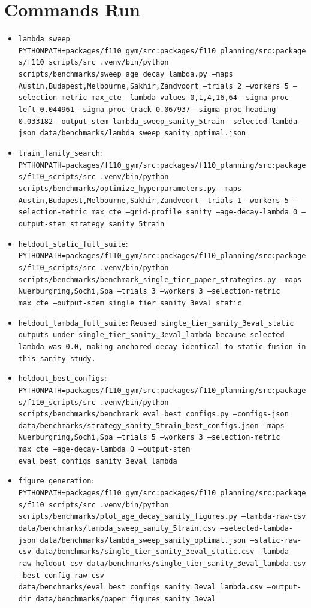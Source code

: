 \documentclass[conference]{IEEEtran}
\begin{document}
\section{Commands Run}
\begin{itemize}[leftmargin=*]
\item \texttt{lambda\_sweep}: \texttt{PYTHONPATH=packages/f110\_gym/src:packages/f110\_planning/src:packages/f110\_scripts/src .venv/bin/python scripts/benchmarks/sweep\_age\_decay\_lambda.py --maps Austin,Budapest,Melbourne,Sakhir,Zandvoort --trials 2 --workers 5 --selection-metric max\_cte --lambda-values 0,1,4,16,64 --sigma-proc-left 0.044961 --sigma-proc-track 0.067937 --sigma-proc-heading 0.033182 --output-stem lambda\_sweep\_sanity\_5train --selected-lambda-json data/benchmarks/lambda\_sweep\_sanity\_optimal.json}
\item \texttt{train\_family\_search}: \texttt{PYTHONPATH=packages/f110\_gym/src:packages/f110\_planning/src:packages/f110\_scripts/src .venv/bin/python scripts/benchmarks/optimize\_hyperparameters.py --maps Austin,Budapest,Melbourne,Sakhir,Zandvoort --trials 1 --workers 5 --selection-metric max\_cte --grid-profile sanity --age-decay-lambda 0 --output-stem strategy\_sanity\_5train}
\item \texttt{heldout\_static\_full\_suite}: \texttt{PYTHONPATH=packages/f110\_gym/src:packages/f110\_planning/src:packages/f110\_scripts/src .venv/bin/python scripts/benchmarks/benchmark\_single\_tier\_paper\_strategies.py --maps Nuerburgring,Sochi,Spa --trials 3 --workers 3 --selection-metric max\_cte --output-stem single\_tier\_sanity\_3eval\_static}
\item \texttt{heldout\_lambda\_full\_suite}: \texttt{Reused single\_tier\_sanity\_3eval\_static outputs under single\_tier\_sanity\_3eval\_lambda because selected lambda was 0.0, making anchored decay identical to static fusion in this sanity study.}
\item \texttt{heldout\_best\_configs}: \texttt{PYTHONPATH=packages/f110\_gym/src:packages/f110\_planning/src:packages/f110\_scripts/src .venv/bin/python scripts/benchmarks/benchmark\_eval\_best\_configs.py --configs-json data/benchmarks/strategy\_sanity\_5train\_best\_configs.json --maps Nuerburgring,Sochi,Spa --trials 5 --workers 3 --selection-metric max\_cte --age-decay-lambda 0 --output-stem eval\_best\_configs\_sanity\_3eval\_lambda}
\item \texttt{figure\_generation}: \texttt{PYTHONPATH=packages/f110\_gym/src:packages/f110\_planning/src:packages/f110\_scripts/src .venv/bin/python scripts/benchmarks/plot\_age\_decay\_sanity\_figures.py --lambda-raw-csv data/benchmarks/lambda\_sweep\_sanity\_5train.csv --selected-lambda-json data/benchmarks/lambda\_sweep\_sanity\_optimal.json --static-raw-csv data/benchmarks/single\_tier\_sanity\_3eval\_static.csv --lambda-raw-heldout-csv data/benchmarks/single\_tier\_sanity\_3eval\_lambda.csv --best-config-raw-csv data/benchmarks/eval\_best\_configs\_sanity\_3eval\_lambda.csv --output-dir data/benchmarks/paper\_figures\_sanity\_3eval}
\end{itemize}
\end{document}
